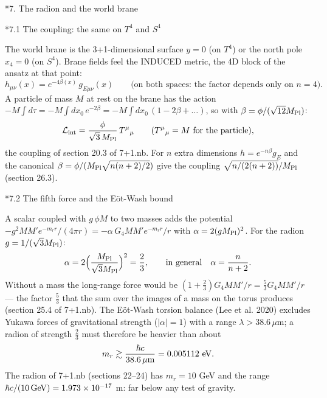 \documentclass[10pt,a4paper]{article}
\makeatletter
\renewcommand\section{\@startsection{section}{1}{\z@}{-3.5ex \@plus -1ex \@minus -.2ex}{2.3ex \@plus.2ex}{\normalfont\Large\bfseries\raggedright}}
\renewcommand\subsection{\@startsection{subsection}{2}{\z@}{-3.25ex\@plus -1ex \@minus -.2ex}{1.5ex \@plus .2ex}{\normalfont\large\bfseries\raggedright}}
\makeatother
\begin{document}
\section*{7. The radion and the world brane}
\subsection*{7.1 The coupling: the same on \texorpdfstring{$T^4$}{T4} and \texorpdfstring{$S^4$}{S4}}
The world brane is the 3+1-dimensional surface $y=0$ (on $T^4$) or the north pole $x_4=0$ (on $S^4$). Brane fields feel the INDUCED metric, the 4D block of the ansatz at that point:
\begin{equation*}
h_{\mu\nu}(x)=e^{-4\beta(x)}\,g_{E\mu\nu}(x)\qquad\text{(on both spaces: the factor depends only on }n=4\text{).}
\end{equation*}
A particle of mass $M$ at rest on the brane has the action $-M\int d\tau=-M\int dx_0\,e^{-2\beta}=-M\int dx_0\,(1-2\beta+\dots)$, so with $\beta=\phi/(\sqrt{12}M_{\rm Pl})$:
\begin{equation*}
\mathcal L_{\rm int}=\frac{\phi}{\sqrt3\,M_{\rm Pl}}\,T^\mu{}_\mu\qquad(T^\mu{}_\mu=M\ \text{for the particle}),
\end{equation*}
the coupling of section 20.3 of 7+1.nb. For $n$ extra dimensions $h=e^{-n\beta}g_E$ and the canonical $\beta=\phi/(M_{\rm Pl}\sqrt{n(n+2)/2})$ give the coupling $\sqrt{n/(2(n+2))}/M_{\rm Pl}$ (section 26.3).

\subsection*{7.2 The fifth force and the Eöt-Wash bound}
A scalar coupled with $g\,\phi M$ to two masses adds the potential $-g^2MM'e^{-m_rr}/(4\pi r)=-\alpha\,G_4MM'e^{-m_rr}/r$ with $\alpha=2(gM_{\rm Pl})^2$. For the radion $g=1/(\sqrt3M_{\rm Pl})$:
\begin{equation*}
\alpha=2\Big(\frac{M_{\rm Pl}}{\sqrt3M_{\rm Pl}}\Big)^2=\frac23,\qquad\text{in general}\quad \alpha=\frac n{n+2} .
\end{equation*}
Without a mass the long-range force would be $(1+\frac23)G_4MM'/r=\frac53G_4MM'/r$ — the factor $\frac53$ that the sum over the images of a mass on the torus produces (section 25.4 of 7+1.nb). The Eöt-Wash torsion balance (Lee et al. 2020) excludes Yukawa forces of gravitational strength ($|\alpha|=1$) with a range $\lambda>38.6\,\mu$m; a radion of strength $\frac23$ must therefore be heavier than about
\begin{equation*}
m_r\gtrsim\frac{\hbar c}{38.6\,\mu{\rm m}}=0.005112\ {\rm eV}.
\end{equation*}
The radion of 7+1.nb (sections 22–24) has $m_r=10$ GeV and the range $\hbar c/(10\,{\rm GeV})=1.973\times10^{-17}$ m: far below any test of gravity.
\end{document}
